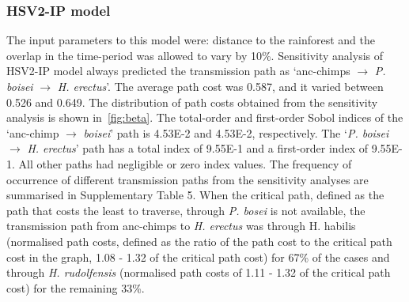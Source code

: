 \documentclass[fleqn,10pt]{wlscirep}
\begin{document}
\subsubsection*{HSV2-IP model}
The input parameters to this model were: distance to the rainforest and the overlap in the time-period was allowed to vary by 10\%. Sensitivity analysis of HSV2-IP model always predicted the transmission path as `anc-chimps $\rightarrow$ \textit{P. boisei} $\rightarrow$ \textit{H. erectus}'.  The average path cost was 0.587, and it varied between 0.526 and 0.649. The distribution of path costs obtained from the sensitivity analysis is shown in~\cref{fig:beta}.  The total-order and first-order Sobol indices of the `anc-chimp $\rightarrow$ \textit{boisei}’ path is 4.53E-2 and 4.53E-2, respectively. The `\textit{P. boisei} $\rightarrow$ \textit{H. erectus}' path has a total index of 9.55E-1 and a first-order index of 9.55E-1. All other paths had negligible or zero index values. The frequency of occurrence of different transmission paths from the sensitivity analyses are summarised in Supplementary Table 5. When the critical path, defined as the path that costs the least to traverse, through \textit{P. bosei} is not available, the transmission path from anc-chimps to \textit{H. erectus} was through H. habilis (normalised path costs, defined as the ratio of the path cost to the critical path cost in the graph, 1.08 - 1.32 of the critical path cost) for 67\% of the cases and through \textit{H. rudolfensis} (normalised path costs of 1.11 - 1.32 of the critical path cost) for the remaining 33\%.
\end{document}
